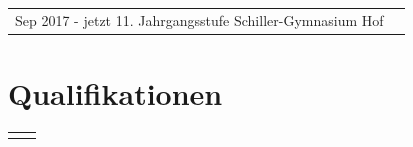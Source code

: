 \documentclass[
	10pt, %
]{FreemanCV}
\begin{document}
\begin{paracol}{2}



\begin{supertabular}{r l} %


	\qualificationentry
	{Sep 2017 - jetzt} %
	{11. Jahrgangsstufe} %
	{} %
	{} %
	{Schiller-Gymnasium Hof} %

\end{supertabular}
\section{Qualifikationen}














\begin{supertabular}{r l} %










\end{supertabular}
\end{paracol}
\end{document}
